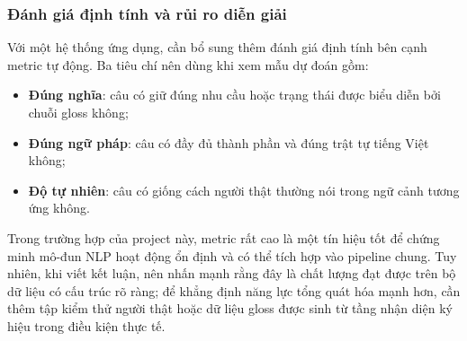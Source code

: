 \subsubsection{Đánh giá định tính và rủi ro diễn giải}

Với một hệ thống ứng dụng, cần bổ sung thêm đánh giá định tính bên cạnh metric tự động.
Ba tiêu chí nên dùng khi xem mẫu dự đoán gồm:
\begin{itemize}
    \item \textbf{Đúng nghĩa}: câu có giữ đúng nhu cầu hoặc trạng thái được biểu diễn bởi
    chuỗi gloss không;
    \item \textbf{Đúng ngữ pháp}: câu có đầy đủ thành phần và đúng trật tự tiếng Việt không;
    \item \textbf{Độ tự nhiên}: câu có giống cách người thật thường nói trong ngữ cảnh tương
    ứng không.
\end{itemize}

Trong trường hợp của project này, metric rất cao là một tín hiệu tốt để chứng minh mô-đun
NLP hoạt động ổn định và có thể tích hợp vào pipeline chung. Tuy nhiên, khi viết kết luận,
nên nhấn mạnh rằng đây là chất lượng đạt được trên bộ dữ liệu có cấu trúc rõ ràng; để
khẳng định năng lực tổng quát hóa mạnh hơn, cần thêm tập kiểm thử người thật hoặc dữ
liệu gloss được sinh từ tầng nhận diện ký hiệu trong điều kiện thực tế.

